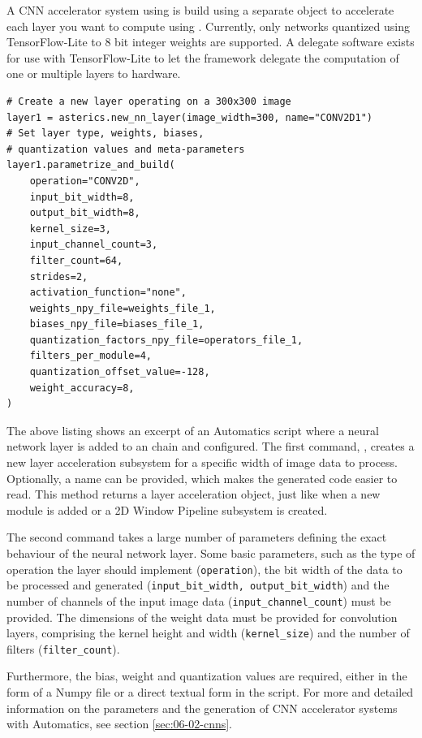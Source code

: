 A CNN accelerator system using \asterics is build using a separate  object to accelerate each layer you want to compute using \asterics.
Currently, only networks quantized using TensorFlow-Lite to 8 bit integer weights are supported.
A delegate software exists for use with TensorFlow-Lite to let the framework delegate the computation of one or multiple layers to \asterics hardware.

\begin{lstlisting}[style=AutomaticsPython]
# Create a new layer operating on a 300x300 image
layer1 = asterics.new_nn_layer(image_width=300, name="CONV2D1")
# Set layer type, weights, biases,
# quantization values and meta-parameters
layer1.parametrize_and_build(
    operation="CONV2D",
    input_bit_width=8,
    output_bit_width=8,
    kernel_size=3,
    input_channel_count=3,
    filter_count=64,
    strides=2,
    activation_function="none",
    weights_npy_file=weights_file_1,
    biases_npy_file=biases_file_1,
    quantization_factors_npy_file=operators_file_1,
    filters_per_module=4,
    quantization_offset_value=-128,
    weight_accuracy=8,
)
\end{lstlisting}

The above listing shows an excerpt of an Automatics script where a neural network layer is added to an \asterics chain and configured.
The first command, , creates a new layer acceleration subsystem for a specific width of image data to process.
Optionally, a name can be provided, which makes the generated code easier to read.
This method returns a layer acceleration object, just like when a new module is added or a 2D Window Pipeline subsystem is created.

The second command  takes a large number of parameters defining the exact behaviour of the neural network layer.
Some basic parameters, such as the type of operation the layer should implement (\texttt{operation}), the bit width of the data to be processed and generated (\texttt{input\_bit\_width, output\_bit\_width}) and the number of channels of the input image data (\texttt{input\_channel\_count}) must be provided.
The dimensions of the weight data must be provided for convolution layers, comprising the kernel height and width (\texttt{kernel\_size}) and the number of filters (\texttt{filter\_count}).

Furthermore, the bias, weight and quantization values are required, either in the form of a Numpy file or a direct textual form in the script.
For more and detailed information on the parameters and the generation of CNN accelerator systems with Automatics, see section \ref{sec:06-02-cnns}.


